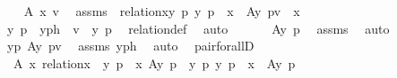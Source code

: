 \begin{isabellebody}
\ \ \isamarkupfalse%
\ A\ x\ v\ \isamarkupfalse%
\ assms\ {\isacharcolon}{\kern0pt}\ {\isachardoublequoteopen}relation{\isacharparenleft}{\kern0pt}x{\isacharparenright}{\kern0pt}{\isachardoublequoteclose}{\isachardoublequoteopen}{\isacharparenleft}{\kern0pt}{\isasymAnd}y\ p{\isachardot}{\kern0pt}\ {\isasymlangle}y{\isacharcomma}{\kern0pt}\ p{\isasymrangle}\ {\isasymin}\ x\ {\isasymLongrightarrow}\ A{\isacharparenleft}{\kern0pt}y{\isacharcomma}{\kern0pt}\ p{\isacharparenright}{\kern0pt}{\isacharparenright}{\kern0pt}{\isachardoublequoteclose}{\isachardoublequoteopen}v\ {\isasymin}\ x{\isachardoublequoteclose}\ \isanewline
\ \ \isamarkupfalse%
\ \isamarkupfalse%
\ y\ p\ \ yph\ {\isacharcolon}{\kern0pt}\ {\isachardoublequoteopen}v\ {\isacharequal}{\kern0pt}\ {\isacharless}{\kern0pt}y{\isacharcomma}{\kern0pt}\ p{\isachargreater}{\kern0pt}{\isachardoublequoteclose}\ \isamarkupfalse%
\ relation{\isacharunderscore}{\kern0pt}def\ \isamarkupfalse%
\ auto\ \isanewline
\ \ \isamarkupfalse%
\ \isamarkupfalse%
\ {\isachardoublequoteopen}A{\isacharparenleft}{\kern0pt}y{\isacharcomma}{\kern0pt}\ p{\isacharparenright}{\kern0pt}{\isachardoublequoteclose}\ \isamarkupfalse%
\ assms\ \isamarkupfalse%
\ auto\ \isanewline
\ \ \isamarkupfalse%
\ \isamarkupfalse%
\ {\isachardoublequoteopen}{\isacharparenleft}{\kern0pt}{\isasymlambda}{\isasymlangle}y{\isacharcomma}{\kern0pt}p{\isasymrangle}{\isachardot}{\kern0pt}\ A{\isacharparenleft}{\kern0pt}y{\isacharcomma}{\kern0pt}\ p{\isacharparenright}{\kern0pt}{\isacharparenright}{\kern0pt}{\isacharparenleft}{\kern0pt}v{\isacharparenright}{\kern0pt}{\isachardoublequoteclose}\ \isamarkupfalse%
\ assms\ yph\ \isamarkupfalse%
\ auto\ \isanewline
{}\isamarkupfalse%
%
\endisatagproof
{\isafoldproof}%
%
\isadelimproof
\isanewline
%
\endisadelimproof
\isanewline
{}\isamarkupfalse%
\ pair{\isacharunderscore}{\kern0pt}forallD\ {\isacharcolon}{\kern0pt}\ \isanewline
\ \ {\isachardoublequoteopen}{\isasymAnd}A\ x{\isachardot}{\kern0pt}\ relation{\isacharparenleft}{\kern0pt}x{\isacharparenright}{\kern0pt}\ {\isasymLongrightarrow}\ {\isasymforall}{\isacharless}{\kern0pt}y{\isacharcomma}{\kern0pt}\ p{\isachargreater}{\kern0pt}\ {\isasymin}\ x{\isachardot}{\kern0pt}\ A{\isacharparenleft}{\kern0pt}y{\isacharcomma}{\kern0pt}\ p{\isacharparenright}{\kern0pt}\ {\isasymLongrightarrow}\ {\isacharparenleft}{\kern0pt}{\isasymAnd}y\ p{\isachardot}{\kern0pt}\ {\isacharless}{\kern0pt}y{\isacharcomma}{\kern0pt}\ p{\isachargreater}{\kern0pt}\ {\isasymin}\ x\ {\isasymLongrightarrow}\ A{\isacharparenleft}{\kern0pt}y{\isacharcomma}{\kern0pt}\ p{\isacharparenright}{\kern0pt}{\isacharparenright}{\kern0pt}{\isachardoublequoteclose}\isanewline

\end{isabellebody}
